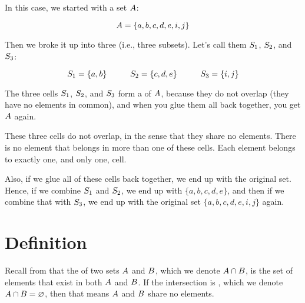 \documentclass[../../../main.tex]{subfiles}
\begin{document}
In this case, we started with a set $A$:

\begin{equation*}
  A = \{ a, b, c, d, e, i, j \}
\end{equation*}

Then we broke it up into three  (i.e., three subsets). Let's call them $S_{1}$, $S_{2}$, and $S_{3}$:

\begin{equation*}
  S_{1} = \{ a, b \} \hskip 1cm 
  S_{2} = \{ c, d, e \} \hskip 1cm 
  S_{3} = \{ i, j \}
\end{equation*}

\begin{aside}
  \begin{remark}
    The three cells $S_{1}$, $S_{2}$, and $S_{3}$ form a  of $A$, because they do not overlap (they have no elements in common), and when you glue them all back together, you get $A$ again.
  \end{remark}
\end{aside}

These three cells do not overlap, in the sense that they share no elements. There is no element that belongs in more than one of these cells. Each element belongs to exactly one, and only one, cell.

Also, if we glue all of these cells back together, we end up with the original set. Hence, if we combine $S_{1}$ and $S_{2}$, we end up with $\{ a, b, c, d, e \}$, and then if we combine that with $S_{3}$, we end up with the original set $\{ a, b, c, d, e, i, j \}$ again.


\section{Definition}

\begin{terminology}
  Recall from  that the  of two sets $A$ and $B$, which we denote $A \cap B$, is the set of elements that exist in both $A$ and $B$. If the intersection is , which we denote $\set{A} \cap \set{B} = \emptyset/$, then that means $A$ and $B$ share no elements.
\end{terminology}
\end{document}
